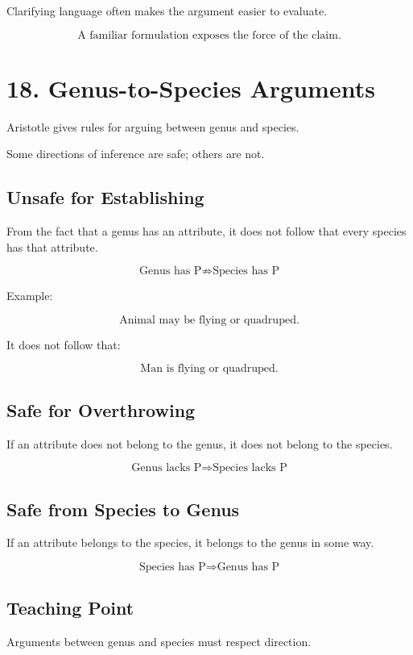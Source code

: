 \documentclass[12pt]{article}
\begin{document}
Clarifying language often makes the argument easier to evaluate.

\[
\boxed{
\text{A familiar formulation exposes the force of the claim.}
}
\]

\section*{18. Genus-to-Species Arguments}

Aristotle gives rules for arguing between genus and species.

Some directions of inference are safe; others are not.

\subsection*{Unsafe for Establishing}

From the fact that a genus has an attribute, it does not follow that every
species has that attribute.

\[
\text{Genus has P} \not\Rightarrow \text{Species has P}
\]

Example:

\[
\text{Animal may be flying or quadruped.}
\]

It does not follow that:

\[
\text{Man is flying or quadruped.}
\]

\subsection*{Safe for Overthrowing}

If an attribute does not belong to the genus, it does not belong to the species.

\[
\text{Genus lacks P} \Rightarrow \text{Species lacks P}
\]

\subsection*{Safe from Species to Genus}

If an attribute belongs to the species, it belongs to the genus in some way.

\[
\text{Species has P} \Rightarrow \text{Genus has P}
\]

\subsection*{Teaching Point}

Arguments between genus and species must respect direction.
\end{document}
